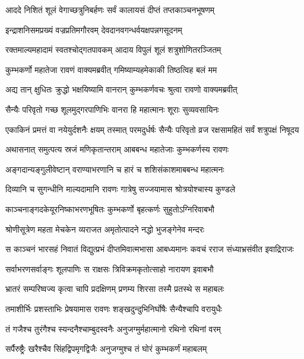 \twolineshloka
{आददे निशितं शूलं वेगाच्छत्रुनिबर्हणः}
{सर्वं कालायसं दीप्तं तप्तकाञ्चनभूषणम्} %

\twolineshloka
{इन्द्राशनिसमप्रख्यं वज्रप्रतिमगौरवम्}
{देवदानवगन्धर्वयक्षपन्नगसूदनम्} %

\twolineshloka
{रक्तमाल्यमहादामं स्वतश्चोद्गतपावकम्}
{आदाय विपुलं शूलं शत्रुशोणितरञ्जितम्} %

\twolineshloka
{कुम्भकर्णो महातेजा रावणं वाक्यमब्रवीत्}
{गमिष्याम्यहमेकाकी तिष्ठत्विह बलं मम} %

\twolineshloka
{अद्य तान् क्षुधितः क्रुद्धो भक्षयिष्यामि वानरान्}
{कुम्भकर्णवचः श्रुत्वा रावणो वाक्यमब्रवीत्} %

\twolineshloka
{सैन्यैः परिवृतो गच्छ शूलमुद्गरपाणिभिः}
{वानरा हि महात्मानः शूराः सुव्यवसायिनः} %

\threelineshloka
{एकाकिनं प्रमत्तं वा नयेयुर्दशनैः क्षयम्}
{तस्मात् परमदुर्धर्षः सैन्यैः परिवृतो व्रज}
{रक्षसामहितं सर्वं शत्रुपक्षं निषूदय} %

\twolineshloka
{अथासनात् समुत्पत्य स्रजं मणिकृतान्तराम्}
{आबबन्ध महातेजाः कुम्भकर्णस्य रावणः} %

\twolineshloka
{अङ्गदान्यङ्गुलीवेष्टान् वराण्याभरणानि च}
{हारं च शशिसंकाशमाबबन्ध महात्मनः} %

\twolineshloka
{दिव्यानि च सुगन्धीनि माल्यदामानि रावणः}
{गात्रेषु सज्जयामास श्रोत्रयोश्चास्य कुण्डले} %

\twolineshloka
{काञ्चनाङ्गदकेयूरनिष्काभरणभूषितः}
{कुम्भकर्णो बृहत्कर्णः सुहुतोऽग्निरिवाबभौ} %

\twolineshloka
{श्रोणीसूत्रेण महता मेचकेन व्यराजत}
{अमृतोत्पादने नद्धो भुजङ्गेनेव मन्दरः} %

\twolineshloka
{स काञ्चनं भारसहं निवातं विद्युत्प्रभं दीप्तमिवात्मभासा}
{आबध्यमानः कवचं रराज संध्याभ्रसंवीत इवाद्रिराजः} %

\twolineshloka
{सर्वाभरणसर्वाङ्गः शूलपाणिः स राक्षसः}
{त्रिविक्रमकृतोत्साहो नारायण इवाबभौ} %

\twolineshloka
{भ्रातरं सम्परिष्वज्य कृत्वा चापि प्रदक्षिणम्}
{प्रणम्य शिरसा तस्मै प्रतस्थे स महाबलः} %

\twolineshloka
{तमाशीर्भिः प्रशस्ताभिः प्रेषयामास रावणः}
{शङ्खदुन्दुभिनिर्घोषैः सैन्यैश्चापि वरायुधैः} %

\twolineshloka
{तं गजैश्च तुरंगैश्च स्यन्दनैश्चाम्बुदस्वनैः}
{अनुजग्मुर्महात्मानो रथिनो रथिनां वरम्} %

\twolineshloka
{सर्पैरुष्ट्रैः खरैश्चैव सिंहद्विपमृगद्विजैः}
{अनुजग्मुश्च तं घोरं कुम्भकर्णं महाबलम्} %


